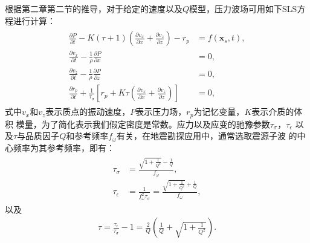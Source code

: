 根据第二章第二节的推导，对于给定的速度以及$Q$模型，压力波场可用如下SLS方程进行计算：
     \begin{eqnarray}
        \begin{aligned}
        \frac{\partial P}{\partial t} -
        K(\tau+1)(\frac{\partial v_x}{\partial x}
        +\frac{\partial v_z}{\partial z})-r_p &=f(\mathbf{x}_s,t),
        \\
        \frac{\partial v_x}{\partial t} - \frac{1}{\rho}\frac{\partial P}{\partial x}
        &=0,\\
        \frac{\partial v_z}{\partial t} - \frac{1}{\rho}\frac{\partial P}{\partial z}&=0,\\
        \frac{\partial{r_p}}{\partial t} +
        \frac{1}{\tau_\sigma}\left[r_p+K\tau(\frac{\partial
        v_x}{\partial x}+\frac{\partial v_z}{\partial z})\right]&=0,
        \end{aligned}
        \label{eq:viscoacoustic}
    \end{eqnarray}
式中$v_x$和$v_z$表示质点的振动速度，$P$表示压力场，$r_p$为记忆变量，$K$表示介质的体积
模量，为了简化表示我们假定密度是常数。应力以及应变的驰豫参数$\tau_\sigma$，$\tau_\epsilon$
以及$\tau$与品质因子$Q$和参考频率$f_\omega$有关，在地震勘探应用中，通常选取震源子波
的中心频率为其参考频率，即有：
    \begin{eqnarray}
        \begin{aligned}
            \tau_\sigma &= \frac{\sqrt{1+\frac{1}{Q^2}}-\frac{1}{Q}}{f_\omega},\\
            \tau_\epsilon &= \frac{1}{f^2_\omega\tau_\sigma}=\frac{\sqrt{1+\frac{1}{Q^2}}+\frac{1}{Q}}{f_\omega},
        \end{aligned}
    \end{eqnarray}
以及
    \begin{eqnarray}
        \tau=\frac{\tau_\epsilon}{\tau_\sigma}-1=\frac{2}{Q}(\frac{1}{Q}+\sqrt{1+\frac{1}{Q^2}}).
        \label{eq:tq}
    \end{eqnarray}

